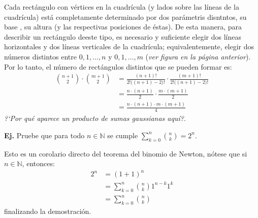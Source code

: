 \documentclass[letterpaper,DIV=14,headsepline,12pt]{scrartcl}
\makeatletter
\newcounter{Ejer}
\newcommand{\pts}{}
\newenvironment{ejercicio}[1]{\noindent
    \ifthenelse{\equal{#1}{1}}{\renewcommand{\pts}{\textbf{(#1 pt)}}}{\renewcommand{\pts}{\textbf{(#1 pts)}}}\textbf{Ej. \theEjer} \pts\stepcounter{Ejer}}{\vspace{.3cm}}
\renewenvironment{proof}[1][]{%
        \par\pushQED{\qed}%
        \normalfont\topsep6pt \partopsep0pt %
        \trivlist
        \item[\hskip\labelsep
                \textbf{\textit{Demostración.}}%
        ]#1
        }{%
        \popQED\endtrivlist\@endpefalse
    }
\newenvironment{solucion}[1][]{%
        \par\pushQED{\hfill \lozenge}%
        \normalfont\topsep6pt \partopsep0pt %
        \trivlist
        \item[\hskip\labelsep
                \textbf{\textit{Solución.}}%
        ]#1
        }{%
        \popQED\endtrivlist\@endpefalse
    }
\makeatother
\begin{document}
    \begin{solucion}
        Cada rectángulo con vértices en la cuadrícula (y lados sobre las líneas de la cuadrícula) está completamente determinado por dos parámetris disntntos, su base , su altura (y las respectivas posiciones de éstas). De esta manera, para describir un rectángulo deeste tipo, es necesario y suficiente elegir dos líneas horizontales y dos líneas verticales de la cuadrícula; equivalentemente, elegir dos números distintos entre $0,1,\ldots,n$ y $0,1,\ldots,m$ (\textit{ver figura en la página anterior}).
        Por lo tanto, el número de rectángulos distintos que se pueden formar es:
        \begin{align*}
            \binom{n+1}{2} \cdot \binom{m+1}{2} & = \frac{(n+1)!}{2! \big((n+1)-2\big)!} \cdot \frac{(m+1)!}{2! \big((n+1)-2\big)!} \\
            & = \frac{n \cdot (n+1)}{2} \cdot \frac{m \cdot (m+1)}{2} \\
            & = \frac{n \cdot (n+1) \cdot m \cdot (m+1)}{4}
        \end{align*}
        \textit{?`Por qué aparece un producto de sumas gaussianas aquí?}.
    \end{solucion}

    \begin{ejercicio}{2}
        Pruebe que para todo $n \in \mathbb{N}$ se cumple $\displaystyle \sum_{k=0}^{n} \binom{n}{k} = 2^n $.
    \end{ejercicio}
    \begin{proof}
        Esto es un corolario directo del teorema del binomio de Newton, nótese que si $n \in \mathbb{N}$, entonces:
        \begin{align*}
            2^n & = (1+1)^n \tag*{cuentas} \\
            & = \sum_{k=0}^{n} \binom{n}{k} 1^{n-k} 1^k \tag{Teorema del binomio de Newton} \\
            & = \sum_{k=0}^{n} \binom{n}{k} \tag*{"cuentas"}
        \end{align*}
        finalizando la demostración.
    \end{proof}
\end{document}

